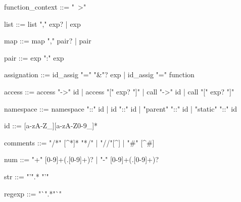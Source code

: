 function_context ::= "~>"

list ::= list "," exp?
   |  exp

map ::= map "," pair?
   |  pair
   
pair ::= exp ":" exp

assignation ::= id_assig "=" "&"? exp
   |  id_assig "=" function
   
access ::= access "->" id
   |  access "[" exp? "]"
   |  call "->" id
   |  call "[" exp? "]"

namespace ::= namespace "::" id
   |  id "::" id
   |  "parent" "::" id
   |  "static" "::" id
   
id ::= [a-zA-Z_][a-zA-Z0-9_]*

comments ::= "/*" [^*]* "*/"
   |  "//"[^\n]
   | "#" [^#]
   
num ::= "+" [0-9]+(.[0-9]+)?
   |  "-" [0-9]+(.[0-9]+)?

str ::= "'".* "'"

regexp ::= "`".*"`" 
	
